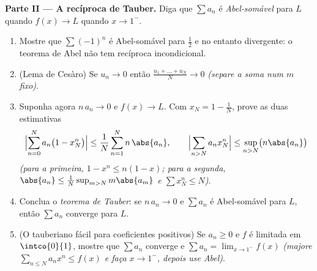 \begin{problem}
\medskip
\noindent\textbf{Parte II --- A recíproca de Tauber.} Diga que $\sum
a_n$ é \emph{Abel-somável} para $L$ quando $f(x) \to L$ quando $x \to
1^-$.
\begin{enumerate}[resume]
  \item Mostre que $\sum (-1)^n$ é Abel-somável para $\frac12$
        e no entanto divergente: o teorema de Abel não tem recíproca
        incondicional.
  \item (Lema de Cesàro) Se $u_n \to 0$ então $\frac{u_1 + \dots
        + u_N}{N} \to 0$ \emph{(separe a soma num $m$ fixo)}.
  \item Suponha agora $n\,a_n \to 0$ e $f(x) \to L$. Com $x_N =
        1 - \frac1N$, prove as duas estimativas
        \[
        \Bigl|\sum_{n=0}^{N} a_n\bigl(1 - x_N^n\bigr)\Bigr|
        \leq \frac{1}{N}\sum_{n=1}^{N} n\,\abs{a_n},
        \qquad
        \Bigl|\sum_{n>N} a_n x_N^n\Bigr|
        \leq \sup_{n>N}\bigl(n\abs{a_n}\bigr)
        \]
        \emph{(para a primeira, $1 - x^n \leq n(1-x)$; para a
        segunda, $\abs{a_n} \leq \frac{1}{N}\sup_{m>N}
        m\abs{a_m}$ e $\sum x_N^n \leq N$)}.
  \item Conclua o \emph{teorema de Tauber}: se $n\,a_n \to 0$ e
        $\sum a_n$ é Abel-somável para $L$, então $\sum a_n$
        converge para $L$.
  \item (O tauberiano fácil para coeficientes positivos) Se $a_n
        \geq 0$ e $f$ é limitada em $\intco{0}{1}$, mostre que
        $\sum a_n$ converge e $\sum a_n = \lim_{x\to1^-}
        f(x)$ \emph{(majore $\sum_{n\leq N}a_nx^n \leq f(x)$ e
        faça $x \to 1^-$, depois use Abel)}.
\end{enumerate}


\end{problem}
